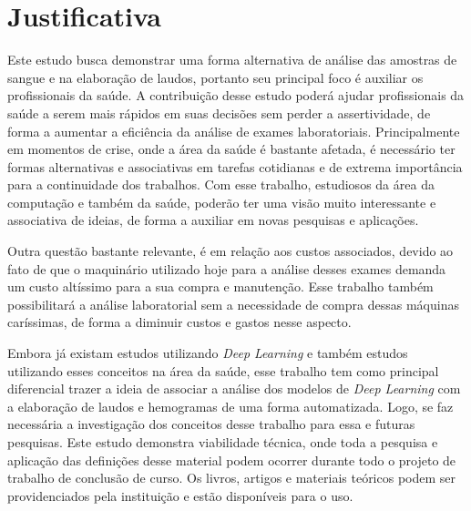 

\section{Justificativa}
\label{sec:justificativa}
Este estudo busca demonstrar uma forma alternativa de análise das amostras de sangue e na elaboração de laudos, portanto seu principal foco é auxiliar os profissionais da saúde. A contribuição desse estudo poderá ajudar profissionais da saúde a serem mais rápidos em suas decisões sem perder a assertividade, de forma a aumentar a eficiência da análise de exames laboratoriais. Principalmente em momentos de crise, onde a área da saúde é bastante afetada, é necessário ter formas alternativas e associativas em tarefas cotidianas e de extrema importância para a continuidade dos trabalhos. Com esse trabalho, estudiosos da área da computação e também da saúde, poderão ter uma visão muito interessante e associativa de ideias, de forma a auxiliar em novas pesquisas e aplicações.

Outra questão bastante relevante, é em relação aos custos associados, devido ao fato de que o maquinário utilizado hoje para a análise desses exames demanda um custo altíssimo para a sua compra e manutenção. Esse trabalho também possibilitará a análise laboratorial sem a necessidade de compra dessas máquinas caríssimas, de forma a diminuir custos e gastos nesse aspecto.

Embora já existam estudos utilizando \emph{Deep Learning} e também estudos utilizando esses conceitos na área da saúde, esse trabalho tem como principal diferencial trazer a ideia de associar a análise dos modelos de \emph{Deep Learning} com a elaboração de laudos e hemogramas de uma forma automatizada. Logo, se faz necessária a investigação dos conceitos desse trabalho para essa e futuras pesquisas. Este estudo demonstra viabilidade técnica, onde toda a pesquisa e aplicação das definições desse material podem ocorrer durante todo o projeto de trabalho de conclusão de curso. Os livros, artigos e materiais teóricos podem ser providenciados pela instituição e estão disponíveis para o uso.


